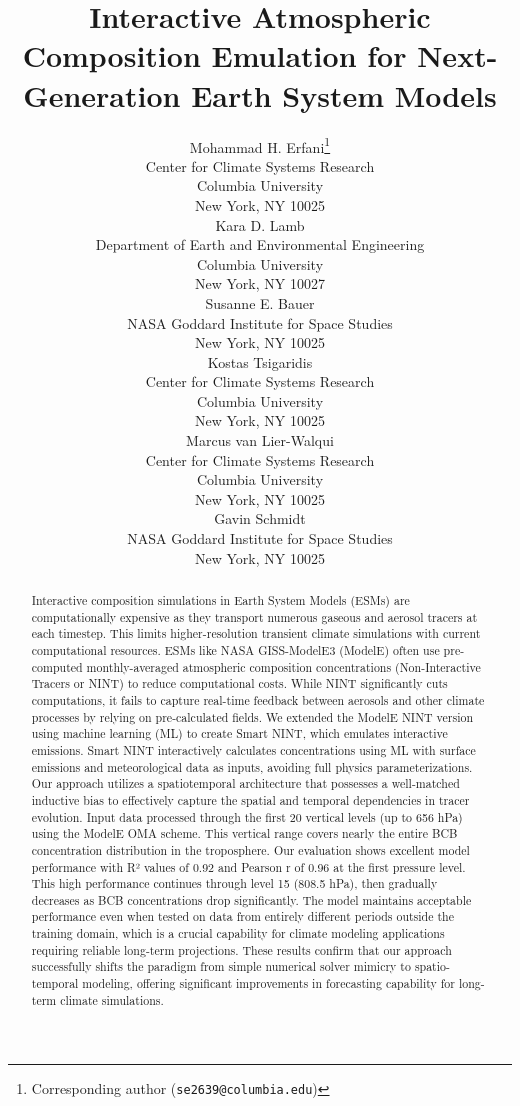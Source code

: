 \documentclass{article}
\title{Interactive Atmospheric Composition Emulation for Next-Generation Earth System Models}
\author{%
    Mohammad H. Erfani\thanks{Corresponding author (\texttt{se2639@columbia.edu})} \\
    Center for Climate Systems Research\\
    Columbia University\\
    New York, NY 10025 \\
    \And
    Kara D. Lamb \\
    Department of Earth and Environmental Engineering \\
    Columbia University \\
    New York, NY 10027\\
    \And
    Susanne E. Bauer \\
    NASA Goddard Institute for Space Studies\\
    New York, NY 10025 \\
    \And
    Kostas Tsigaridis \\
    Center for Climate Systems Research\\
    Columbia University\\
    New York, NY 10025 \\
    \And
    Marcus van Lier-Walqui\\
    Center for Climate Systems Research\\
    Columbia University\\
    New York, NY 10025\\
    \And
    Gavin Schmidt\\
    NASA Goddard Institute for Space Studies\\
    New York, NY 10025 \\
}
\begin{document}
\maketitle

\begin{abstract}
    Interactive composition simulations in Earth System Models (ESMs) are computationally expensive as they transport numerous gaseous and aerosol tracers at each timestep. This limits higher-resolution transient climate simulations with current computational resources. ESMs like NASA GISS-ModelE3 (ModelE) often use pre-computed monthly-averaged atmospheric composition concentrations (Non-Interactive Tracers or NINT) to reduce computational costs. While NINT significantly cuts computations, it fails to capture real-time feedback between aerosols and other climate processes by relying on pre-calculated fields. We extended the ModelE NINT version using machine learning (ML) to create Smart NINT, which emulates interactive emissions. Smart NINT interactively calculates concentrations using ML with surface emissions and meteorological data as inputs, avoiding full physics parameterizations. Our approach utilizes a spatiotemporal architecture that possesses a well-matched inductive bias to effectively capture the spatial and temporal dependencies in tracer evolution. Input data processed through the first 20 vertical levels (up to 656 hPa) using the ModelE OMA scheme. This vertical range covers nearly the entire BCB concentration distribution in the troposphere. Our evaluation shows excellent model performance with R² values of 0.92 and Pearson r of 0.96 at the first pressure level. This high performance continues through level 15 (808.5 hPa), then gradually decreases as BCB concentrations drop significantly. The model maintains acceptable performance even when tested on data from entirely different periods outside the training domain, which is a crucial capability for climate modeling applications requiring reliable long-term projections. These results confirm that our approach successfully shifts the paradigm from simple numerical solver mimicry to spatio-temporal modeling, offering significant improvements in forecasting capability for long-term climate simulations.
\end{abstract}
\end{document}
